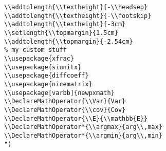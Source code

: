 \documentclass[c]{article}
\DeclareMathOperator{\Var}{Var}
\DeclareMathOperator{\cov}{Cov}
\DeclareMathOperator{\E}{\mathbb{E}}
\DeclareMathOperator*{\argmax}{arg\,max}
\DeclareMathOperator*{\argmin}{arg\,min}
\theoremstyle{plain}%
\theoremstyle{definition}
\theoremstyle{remark}
\begin{document}
\begin{enumerate}
\begin{verbatim}
\\addtolength{\\textheight}{-\\headsep}
\\addtolength{\\textheight}{-\\footskip}
\\addtolength{\\textheight}{-3cm}
\\setlength{\\topmargin}{1.5cm}
\\addtolength{\\topmargin}{-2.54cm}
% my custom stuff
\\usepackage{xfrac}
\\usepackage{siunitx}
\\usepackage{diffcoeff}
\\usepackage{nicematrix}
\\usepackage[varbb]{newpxmath}
\\DeclareMathOperator{\\Var}{Var}
\\DeclareMathOperator{\\cov}{Cov}
\\DeclareMathOperator{\\E}{\\mathbb{E}}
\\DeclareMathOperator*{\\argmax}{arg\\,max}
\\DeclareMathOperator*{\\argmin}{arg\\,min}
")
\end{verbatim}
\end{enumerate}
\end{document}
